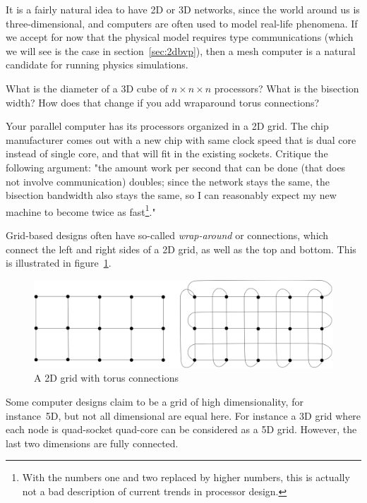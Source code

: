 It is a fairly natural idea to have 2D or 3D networks, since the world
around us is three-dimensional, and computers are often used to model
real-life phenomena. If we accept for now that the physical model
requires  type communications (which we
will see is the case in section~\ref{sec:2dbvp}), then a mesh computer
is a natural candidate for running physics simulations.

\begin{exercise}
  What is the diameter of a 3D cube of $n\times n\times n$ processors? What is the
  bisection width? How does that change if you add wraparound torus
  connections?
\end{exercise}

\begin{exercise}
  Your parallel computer has its processors organized in a 2D grid.
  The chip manufacturer comes out with a new chip with same clock
  speed that is dual core instead of single core, and that will fit in
  the existing sockets. Critique the following argument: "the amount
  work per second that can be done (that does not involve communication)
  doubles; since the network stays the same, the bisection bandwidth
  also stays the same, so I can reasonably expect my new machine to
  become twice as fast\footnote{With the numbers one and two replaced
    by higher numbers, this is actually not a bad description of
    current trends in processor design.}."
\end{exercise}

Grid-based designs often have so-called \emph{wrap-around} or
 connections, which connect the left and right sides
of a 2D grid, as well as the top and bottom. This is illustrated in
figure~\ref{fig:torus}.
\begin{figure}[th]
  \includegraphics[scale=.11]{graphics-public/torus}
  \caption{A 2D grid with torus connections}
  \label{fig:torus}
\end{figure}

Some computer designs claim to be a grid of high dimensionality, for
instance~5D, but not all dimensional are equal here. For instance a 3D
grid where each node is quad-socket quad-core can be considered as a
5D grid. However, the last two dimensions are fully connected.

